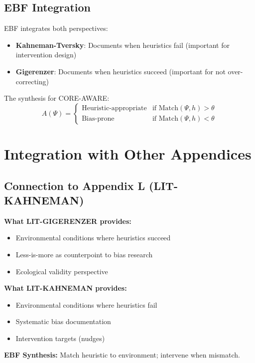 \subsection{EBF Integration}

EBF integrates both perspectives:
\begin{itemize}[nosep]
\item \textbf{Kahneman-Tversky}: Documents when heuristics fail (important for intervention design)
\item \textbf{Gigerenzer}: Documents when heuristics succeed (important for not over-correcting)
\end{itemize}

The synthesis for CORE-AWARE:
\begin{equation}
A(\Psi) = \begin{cases}
\text{Heuristic-appropriate} & \text{if } \text{Match}(\Psi, h) > \theta \\
\text{Bias-prone} & \text{if } \text{Match}(\Psi, h) < \theta
\end{cases}
\end{equation}


\section{Integration with Other Appendices}
\label{sec:gi-integration}

\subsection{Connection to Appendix L (LIT-KAHNEMAN)}

\begin{tcolorbox}[colback=yellow!5!white, colframe=yellow!75!black,
    title=Integration: LIT-GIGERENZER $\leftrightarrow$ LIT-KAHNEMAN]
\textbf{What LIT-GIGERENZER provides:}
\begin{itemize}[nosep]
\item Environmental conditions where heuristics succeed
\item Less-is-more as counterpoint to bias research
\item Ecological validity perspective
\end{itemize}

\textbf{What LIT-KAHNEMAN provides:}
\begin{itemize}[nosep]
\item Environmental conditions where heuristics fail
\item Systematic bias documentation
\item Intervention targets (nudges)
\end{itemize}

\textbf{EBF Synthesis:} Match heuristic to environment; intervene when mismatch.
\end{tcolorbox}

